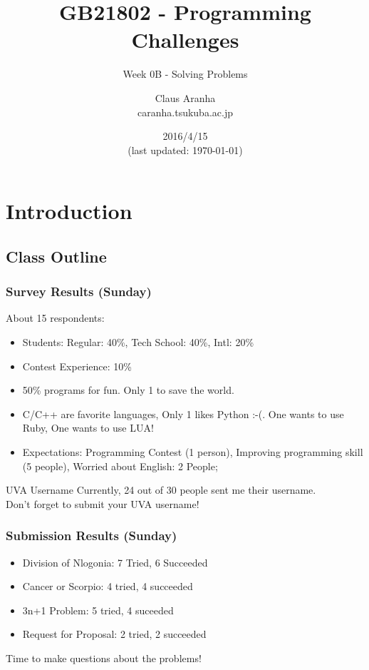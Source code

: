 \documentclass{beamer}
\title[GB21802]{GB21802 - Programming Challenges}
\subtitle[]{Week 0B - Solving Problems}
\author[Claus Aranha]{Claus Aranha\\{\footnotesize caranha\@@cs.tsukuba.ac.jp}}
\institute{Department of Computer Science}
\date{2016/4/15\\{\smaller(last updated: \today)}}
\begin{document}

\section{Introduction}
\subsection{Class Outline}

\begin{frame}
\maketitle
\end{frame}

\begin{frame}
  \frametitle{Survey Results (Sunday)}

  About 15 respondents:
  \begin{itemize}
  \item Students: Regular: 40\%, Tech School: 40\%, Intl: 20\%
  \item Contest Experience: 10\%
  \item 50\% programs for fun. Only 1 to save the world.
  \item C/C++ are favorite languages, Only 1 likes Python :-(. One
    wants to use Ruby, One wants to use LUA!
  \item Expectations: Programming Contest (1 person), Improving
    programming skill (5 people), Worried about English: 2 People;
  \end{itemize}


  \vfill
  
  \begin{alertblock}{UVA Username}
    Currently, \alert{24 out of 30} people sent me their username.\\
    Don't forget to submit your UVA username!
  \end{alertblock}
\end{frame}

\begin{frame}
  \frametitle{Submission Results (Sunday)}

  \begin{itemize}
  \item Division of Nlogonia: 7 Tried, 6 Succeeded
  \item Cancer or Scorpio: 4 tried, 4 succeeded
  \item 3n+1 Problem: 5 tried, 4 suceeded
  \item Request for Proposal: 2 tried, 2 succeeded
  \end{itemize}

  \vfill

  \begin{center}
    Time to make questions about the problems!
  \end{center}
\end{frame}
\end{document}
